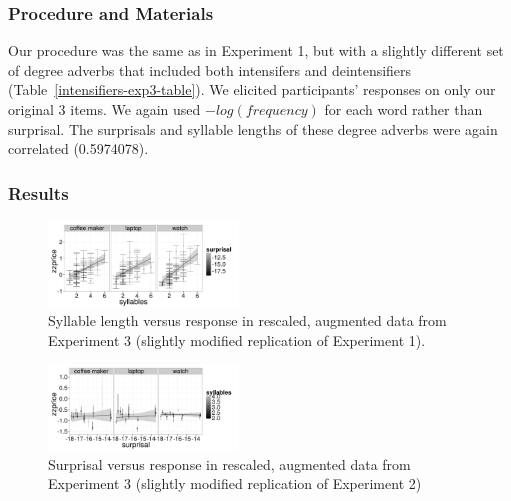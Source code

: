 \documentclass[10pt,letterpaper]{article}
\begin{document}
    \subsubsection{Procedure and Materials}
    
      Our procedure was the same as in Experiment 1, but with a slightly different set of degree adverbs that included both intensifers and deintensifiers (Table~\ref{intensifiers-exp3-table}). We elicited participants' responses on only our original 3 items. We again used $-log(frequency)$ for each word rather than surprisal. The surprisals and syllable lengths of these degree adverbs were again correlated (0.5974078).
  
  \subsubsection{Results}
%   
    \begin{figure}[ht]
    \begin{center}
    \includegraphics[width=0.45\textwidth]{exp3-intensifiers-zz-syllables.png}
    \end{center}
    \caption{Syllable length versus response in rescaled, augmented data from Experiment 3 (slightly modified replication of Experiment 1).} 
    \label{exp3-intensifiers}
    \end{figure}
    
    \begin{figure}[ht]
    \begin{center}
    \includegraphics[width=0.45\textwidth]{exp3-deintensifiers-zz.png}
    \end{center}
    \caption{Surprisal versus response in rescaled, augmented data from Experiment 3 (slightly modified replication of Experiment 2)} 
    \label{exp3-deintensifiers}
    \end{figure}
  
\end{document}
